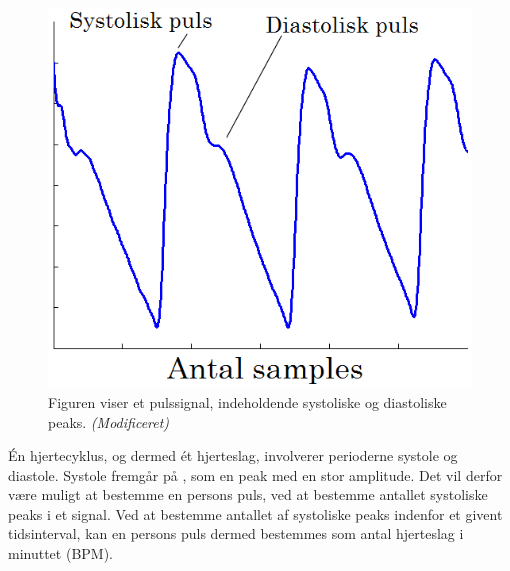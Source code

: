 \begin{figure}[H]
	\centering
	\includegraphics[scale=0.54]{figures/cDesign/puls_goldenstand.png}
	\caption{Figuren viser et pulssignal, indeholdende systoliske og diastoliske peaks. \citep{GanZahedi2011} \textit{(Modificeret)}}
	\label{fig:puls_goldenstand}
\end{figure}

Én hjertecyklus, og dermed ét hjerteslag, involverer perioderne systole og diastole. Systole fremgår på , som en peak med en stor amplitude. Det vil derfor være muligt at bestemme en persons puls, ved at bestemme antallet systoliske peaks i et signal. Ved at bestemme antallet af systoliske peaks indenfor et givent tidsinterval, kan en persons puls dermed bestemmes som antal hjerteslag i minuttet (BPM).


%
%
